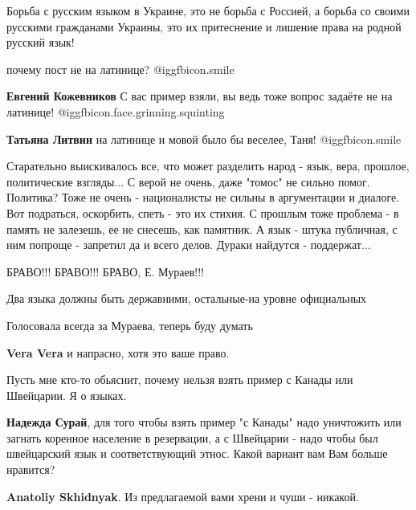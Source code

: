 \begin{itemize}

Борьба с русским языком в Украине, это не борьба с Россией, а борьба со своими
русскими гражданами Украины, это их притеснение и лишение права на родной
русский язык!

почему пост не на латинице?  @igg{fbicon.smile} 

\begin{itemize} %
\textbf{Евгений Кожевников} С вас пример взяли, вы ведь тоже вопрос задаёте не на латинице!  @igg{fbicon.face.grinning.squinting} 

\textbf{Татьяна Литвин} на латинице и мовой было бы веселее, Таня!  @igg{fbicon.smile} 
\end{itemize} %


Старательно выискивалось все, что может разделить народ - язык, вера, прошлое,
политические взгляды... С верой не очень, даже "томос" не сильно помог.
Политика? Тоже не очень - националисты не сильны в аргументации и диалоге. Вот
подраться, оскорбить, спеть - это их стихия. С прошлым тоже проблема - в память
не залезешь, ее не снесешь, как памятник. А язык - штука публичная, с ним
попроще - запретил да и всего делов. Дураки найдутся - поддержат...


БРАВО!!! БРАВО!!! БРАВО, Е. Мураев!!!

Два языка должны быть державними, остальные-на уровне официальных

Голосовала всегда за Мураева, теперь буду думать

\begin{itemize} %
\textbf{Vera Vera} и напрасно, хотя это ваше право.
\end{itemize} %

Пусть мне кто-то обьяснит, почему нельзя взять пример с Канады или Швейцарии. Я о языках.

\begin{itemize} %
\textbf{Надежда Сурай}, для того чтобы взять пример "с Канады" надо уничтожить или загнать коренное население в резервации, а с Швейцарии - надо чтобы был швейцарский язык и соответствующий этнос. Какой вариант вам Вам больше нравится?

\textbf{Anatoliy Skhidnyak}. Из предлагаемой вами хрени и чуши - никакой.


\end{itemize}
\end{itemize}

